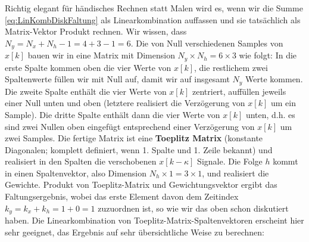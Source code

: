 Richtig elegant für händisches Rechnen statt Malen wird es,
wenn wir die Summe \eqref{eq:LinKombDiskFaltung} als
Linearkombination auffassen und
sie tatsächlich als Matrix-Vektor Produkt rechnen. Wir wissen, dass $N_y=N_x+N_h-1=4+3-1=6$.
%
Die von Null verschiedenen Samples von $x[k]$
bauen wir in eine Matrix mit Dimension $N_y \times N_h = 6 \times 3$
wie folgt:
%
In die erste Spalte kommen oben die vier Werte von $x[k]$, die restlichem zwei
Spaltenwerte füllen wir mit Null auf, damit wir auf insgesamt $N_y$ Werte kommen.
%
Die zweite Spalte enthält die vier Werte von $x[k]$ zentriert, auffüllen jeweils
einer Null unten und oben (letztere realisiert die Verzögerung von $x[k]$
um ein Sample).
%
Die dritte Spalte enthält dann die vier Werte von $x[k]$ unten, d.h. es sind
zwei Nullen oben eingefügt entsprechend einer Verzögerung von $x[k]$ um zwei Samples.
%
Die fertige Matrix ist eine \textbf{Toeplitz Matrix} (konstante Diagonalen;
komplett definiert, wenn 1. Spalte und 1. Zeile bekannt)
und realisiert in den Spalten
die verschobenen $x[k-\kappa]$ Signale.
%
Die Folge $h$ kommt in einen Spaltenvektor, also Dimension $N_h \times 1 = 3 \times 1$,
und realisiert die Gewichte.
%
Produkt von Toeplitz-Matrix und Gewichtungsvektor ergibt das Faltungsergebnis,
wobei das erste Element davon dem Zeitindex $k_y = k_x + k_h = 1 + 0 = 1$ zuzuordnen
ist, so wie wir das oben schon diskutiert haben.
%
Die Linearkombination von Toeplitz-Matrix-Spaltenvektoren erscheint hier sehr geeignet,
das Ergebnis auf sehr übersichtliche Weise zu berechnen:
%
